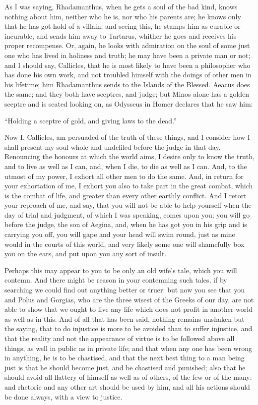 \documentclass[11pt,letter]{article}
\begin{document}
\par  As I was saying, Rhadamanthus, when he gets a soul of the bad kind, knows nothing about him, neither who he is, nor who his parents are; he knows only that he has got hold of a villain; and seeing this, he stamps him as curable or incurable, and sends him away to Tartarus, whither he goes and receives his proper recompense. Or, again, he looks with admiration on the soul of some just one who has lived in holiness and truth; he may have been a private man or not; and I should say, Callicles, that he is most likely to have been a philosopher who has done his own work, and not troubled himself with the doings of other men in his lifetime; him Rhadamanthus sends to the Islands of the Blessed. Aeacus does the same; and they both have sceptres, and judge; but Minos alone has a golden sceptre and is seated looking on, as Odysseus in Homer declares that he saw him:

\par  “Holding a sceptre of gold, and giving laws to the dead.”

\par  Now I, Callicles, am persuaded of the truth of these things, and I consider how I shall present my soul whole and undefiled before the judge in that day. Renouncing the honours at which the world aims, I desire only to know the truth, and to live as well as I can, and, when I die, to die as well as I can. And, to the utmost of my power, I exhort all other men to do the same. And, in return for your exhortation of me, I exhort you also to take part in the great combat, which is the combat of life, and greater than every other earthly conflict. And I retort your reproach of me, and say, that you will not be able to help yourself when the day of trial and judgment, of which I was speaking, comes upon you; you will go before the judge, the son of Aegina, and, when he has got you in his grip and is carrying you off, you will gape and your head will swim round, just as mine would in the courts of this world, and very likely some one will shamefully box you on the ears, and put upon you any sort of insult.

\par  Perhaps this may appear to you to be only an old wife’s tale, which you will contemn. And there might be reason in your contemning such tales, if by searching we could find out anything better or truer: but now you see that you and Polus and Gorgias, who are the three wisest of the Greeks of our day, are not able to show that we ought to live any life which does not profit in another world as well as in this. And of all that has been said, nothing remains unshaken but the saying, that to do injustice is more to be avoided than to suffer injustice, and that the reality and not the appearance of virtue is to be followed above all things, as well in public as in private life; and that when any one has been wrong in anything, he is to be chastised, and that the next best thing to a man being just is that he should become just, and be chastised and punished; also that he should avoid all flattery of himself as well as of others, of the few or of the many: and rhetoric and any other art should be used by him, and all his actions should be done always, with a view to justice.
\end{document}
